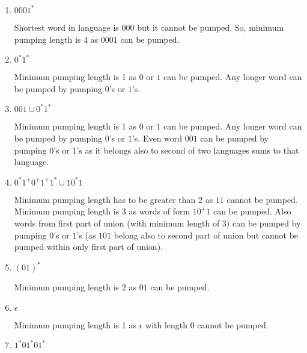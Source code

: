 \begin{enumerate}
            \begin{enumerate}
                  \item $0001^\ast$
                        
                        Shortest word in language is $000$ but it cannot be pumped. So, minimum pumping length is 4 as $0001$ can be pumped.
                        
                  \item $0^\ast 1^\ast$
                        
                        Minimum pumping length is 1 as $0$ or $1$ can be pumped. Any longer word can be pumped by pumping $0$'s or $1$'s. 
                        
                  \item $001 \cup 0^\ast 1^\ast$
                        
                        Minimum pumping length is 1 as $0$ or $1$ can be pumped. Any longer word can be pumped by pumping $0$'s or $1$'s. Even word $001$ can be pumped by pumping $0$'s or $1$'s as it belongs also to second of two languages sums to that language.
                        
                  \item $0^\ast 1^+ 0^+ 1^+ 1^\ast \cup 10^\ast1$
                        
                        Minimum pumping length has to be greater than 2 as $11$ cannot be pumped. 
                        Minimum pumping length is 3 as words of form $10^{+}1$ can be pumped. Also words from first part of union (with minimum length of 3) can be pumped by pumping $0$'s or $1$'s (as $101$ belong also to second part of union but cannot be pumped within only first part of union).
                        
                  \item $(01)^\ast$
                        
                        Minimum pumping length is 2 as $01$ can be pumped.
                        
                  \item $\epsilon$
                        
                        Minimum pumping length is 1 as $\epsilon$ with length 0 cannot be pumped.
                        
                  \item $1^\ast01^\ast01^\ast$
                        

\end{enumerate}
\end{enumerate}
